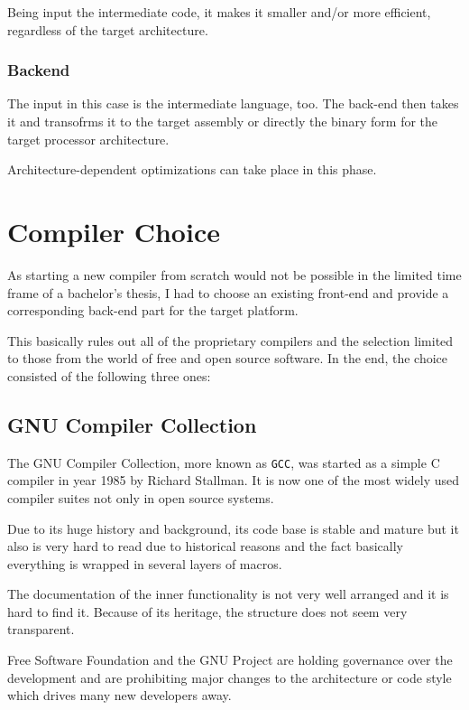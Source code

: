                 Being input the intermediate code, it makes it smaller and/or more efficient, regardless of the target architecture.

        \subsection{Back\-end}

            The input in this case is the intermediate language, too. The back-end then takes it and transofrms it to the target assembly or directly the binary form for the target processor architecture.

            Architecture-dependent optimizations can take place in this phase.

\chapter{Compiler Choice}\label{compiler}

As starting a new compiler from scratch would not be possible in the limited time frame of a bachelor's thesis, I had to choose an existing front-end and provide a corresponding back-end part for the target platform.

This basically rules out all of the proprietary compilers and the selection limited to those from the world of free and open source software. In the end, the choice consisted of the following three ones:


    \section{GNU Compiler Collection}

    The GNU Compiler Collection, more known as \texttt{GCC}, was started as a simple C compiler in year 1985 by Richard Stallman. It is now one of the most widely used compiler suites not only in open source systems.

    Due to its huge history and background, its code base is stable and mature but it also is very hard to read due to historical reasons and the fact basically everything is wrapped in several layers of macros.

    The documentation of the inner functionality is not very well arranged and it is hard to find it. Because of its heritage, the structure does not seem very transparent.

    Free Software Foundation and the GNU Project are holding governance over the development and are prohibiting major changes to the architecture or code style which drives many new developers away.

